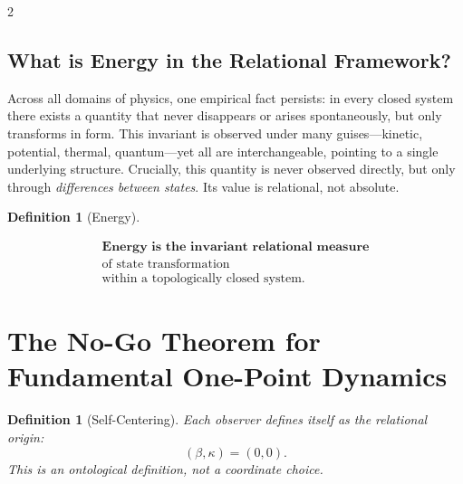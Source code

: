 \documentclass[10pt, a4paper]{article}
\newtheorem{definition}[theorem]{Definition}
\begin{document}
\begin{multicols}{2}

\subsection{What is Energy in the Relational Framework?}

Across all domains of physics, one empirical fact persists: in every closed system there exists a quantity that never disappears or arises spontaneously, but only transforms in form. This invariant is observed under many guises---kinetic, potential, thermal, quantum---yet all are interchangeable, pointing to a single underlying structure. Crucially, this quantity is never observed directly, but only through \textit{differences between states}. Its value is relational, not absolute.

\begin{tcolorbox}[colback=gray!5, colframe=black!80!black, title=Energy:]
\begin{definition}[Energy]
\hypertarget{def:energy}{}\label{def:energy}
\[
\boxed{
\begin{array}{c}
\textbf{Energy is the invariant relational measure} \\
\text{of state transformation} \\
\text{within a topologically closed system.}
\end{array}
}
\]
\end{definition}
\end{tcolorbox}



\section{The No-Go Theorem for Fundamental One-Point Dynamics}
\hypertarget{sec:sub_v_rel}{}\label{sec:sub_v_rel}
\hypertarget{thm:no-go}{}\label{thm:no-go}

\begin{definition}[Self-Centering]
Each observer defines itself as the relational origin:
\[
(\beta,\kappa)=(0,0).
\]
This is an ontological definition, not a coordinate choice.
\end{definition}


\end{multicols}
\end{document}
